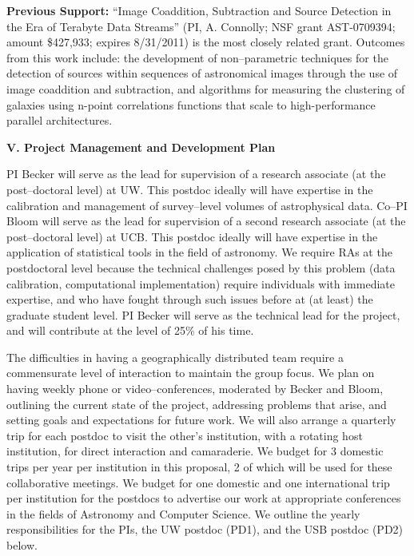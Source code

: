 {\bf Previous Support:} ``Image Coaddition, Subtraction and Source Detection in
the Era of Terabyte Data Streams'' (PI, A. Connolly; NSF grant AST-0709394;
amount \$427,933; expires 8/31/2011) is the most closely related grant. Outcomes
from this work include: the development of non--parametric techniques for the
detection of sources within sequences of astronomical images through the use of
image coaddition and subtraction, and algorithms for measuring the clustering of
galaxies using n-point correlations functions that scale to high-performance
parallel architectures.

\bigskip \centerline{\bf V. Project Management and Development Plan} \smallskip

PI Becker will serve as the lead for supervision of a research associate (at the
post--doctoral level) at UW.  This postdoc ideally will have expertise in the
calibration and management of survey--level volumes of astrophysical data.
Co--PI Bloom will serve as the lead for supervision of a second research
associate (at the post--doctoral level) at UCB.  This postdoc ideally will have
expertise in the application of statistical tools in the field of astronomy.  We
require RAs at the postdoctoral level because the technical challenges posed by
this problem (data calibration, computational implementation) require
individuals with immediate expertise, and who have fought through such issues
before at (at least) the graduate student level. PI Becker will serve as the
technical lead for the project, and will contribute at the level of 25\% of his
time.

The difficulties in having a geographically distributed team require a
commensurate level of interaction to maintain the group focus.  We plan on
having weekly phone or video--conferences, moderated by Becker and Bloom,
outlining the current state of the project, addressing problems that arise, and
setting goals and expectations for future work.  We will also arrange a
quarterly trip for each postdoc to visit the other's institution, with a
rotating host institution, for direct interaction and camaraderie. We budget for
3 domestic trips per year per institution in this proposal, 2 of which will be
used for these collaborative meetings.  We budget for one domestic and one
international trip per institution for the postdocs to advertise our work at
appropriate conferences in the fields of Astronomy and Computer Science. We
outline the yearly responsibilities for the PIs, the UW postdoc (PD1), and the
USB postdoc (PD2) below.

